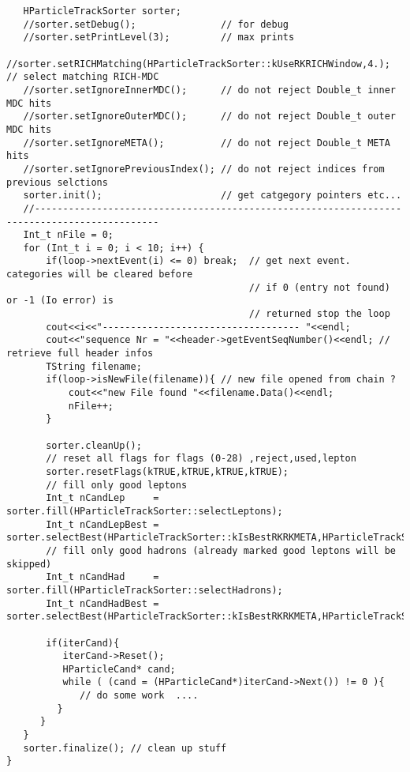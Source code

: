 \begin{lstlisting}
   HParticleTrackSorter sorter;
   //sorter.setDebug();               // for debug
   //sorter.setPrintLevel(3);         // max prints
   //sorter.setRICHMatching(HParticleTrackSorter::kUseRKRICHWindow,4.); // select matching RICH-MDC
   //sorter.setIgnoreInnerMDC();      // do not reject Double_t inner MDC hits
   //sorter.setIgnoreOuterMDC();      // do not reject Double_t outer MDC hits
   //sorter.setIgnoreMETA();          // do not reject Double_t META hits
   //sorter.setIgnorePreviousIndex(); // do not reject indices from previous selctions
   sorter.init();                     // get catgegory pointers etc...
   //--------------------------------------------------------------------------------------------
   Int_t nFile = 0;
   for (Int_t i = 0; i < 10; i++) {
       if(loop->nextEvent(i) <= 0) break;  // get next event. categories will be cleared before
                                           // if 0 (entry not found) or -1 (Io error) is 
                                           // returned stop the loop
       cout<<i<<"----------------------------------- "<<endl;
       cout<<"sequence Nr = "<<header->getEventSeqNumber()<<endl; // retrieve full header infos
       TString filename;
       if(loop->isNewFile(filename)){ // new file opened from chain ?
           cout<<"new File found "<<filename.Data()<<endl;
           nFile++;
       }

       sorter.cleanUp();
       // reset all flags for flags (0-28) ,reject,used,lepton
       sorter.resetFlags(kTRUE,kTRUE,kTRUE,kTRUE);     
       // fill only good leptons
       Int_t nCandLep     = sorter.fill(HParticleTrackSorter::selectLeptons);   
       Int_t nCandLepBest = sorter.selectBest(HParticleTrackSorter::kIsBestRKRKMETA,HParticleTrackSorter::kIsLepton);
       // fill only good hadrons (already marked good leptons will be skipped)
       Int_t nCandHad     = sorter.fill(HParticleTrackSorter::selectHadrons);   
       Int_t nCandHadBest = sorter.selectBest(HParticleTrackSorter::kIsBestRKRKMETA,HParticleTrackSorter::kIsHadron);

       if(iterCand){
          iterCand->Reset();
          HParticleCand* cand;
          while ( (cand = (HParticleCand*)iterCand->Next()) != 0 ){
             // do some work  ....
         }
      }
   }
   sorter.finalize(); // clean up stuff
}
\end{lstlisting}

